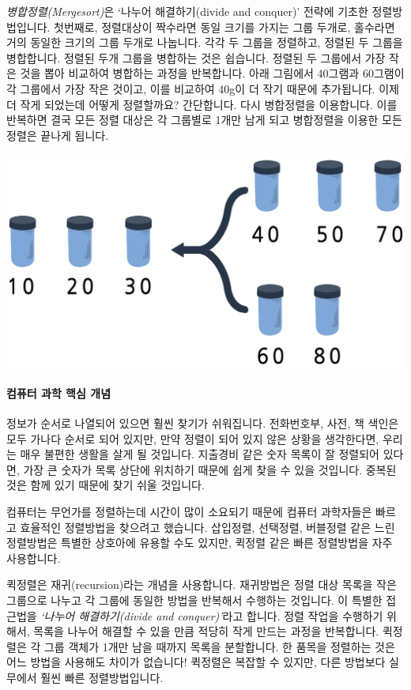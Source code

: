 \documentclass[]{article}
\begin{document}
\emph{병합정렬(Mergesort)}은 `나누어 해결하기(divide and conquer)'
전략에 기초한 정렬방법입니다. 첫번째로, 정렬대상이 짝수라면 동일 크기를
가지는 그룹 두개로, 홀수라면 거의 동일한 크기의 그룹 두개로 나눕니다.
각각 두 그룹을 정렬하고, 정렬된 두 그룹을 병합합니다. 정렬된 두개 그룹을
병합하는 것은 쉽습니다. 정렬된 두 그룹에서 가장 작은 것을 뽑아 비교하여
병합하는 과정을 반복합니다. 아래 그림에서 40그램과 60그램이 각 그룹에서
가장 작은 것이고, 이를 비교하여 40g이 더 작기 때문에 추가됩니다. 이제 더
작게 되었는데 어떻게 정렬할까요? 간단합니다. 다시 병합정렬을 이용합니다.
이를 반복하면 결국 모든 정렬 대상은 각 그룹별로 1개만 남게 되고
병합정렬을 이용한 모든 정렬은 끝나게 됩니다.

\includegraphics{csunplugged/02-part/img/ch07-sort/07-sort-05-merge.png}

\mbox{}\paragraph{컴퓨터 과학 핵심 개념}\label{section-110}

정보가 순서로 나열되어 있으면 훨씬 찾기가 쉬워집니다. 전화번호부, 사전,
책 색인은 모두 가나다 순서로 되어 있지만, 만약 정렬이 되어 있지 않은
상황을 생각한다면, 우리는 매우 불편한 생활을 살게 될 것입니다. 지출경비
같은 숫자 목록이 잘 정렬되어 있다면, 가장 큰 숫자가 목록 상단에 위치하기
때문에 쉽게 찾을 수 있을 것입니다. 중복된 것은 함께 있기 때문에 찾기
쉬울 것입니다.

컴퓨터는 무언가를 정렬하는데 시간이 많이 소요되기 때문에 컴퓨터
과학자들은 빠르고 효율적인 정렬방법을 찾으려고 했습니다. 삽입정렬,
선택정렬, 버블정렬 같은 느린 정렬방법은 특별한 상호아에 유용할 수도
있지만, 퀵정렬 같은 빠른 정렬방법을 자주 사용합니다.

퀵정렬은 재귀(recursion)라는 개념을 사용합니다. 재귀방법은 정렬 대상
목록을 작은 그룹으로 나누고 각 그룹에 동일한 방법을 반복해서 수행하는
것입니다. 이 특별한 접근법을 \emph{`나누어 해결하기(divide and
conquer)'}라고 합니다. 정렬 작업을 수행하기 위해서, 목록을 나누어 해결할
수 있을 만큼 적당히 작게 만드는 과정을 반복합니다. 퀵정렬은 각 그룹
객체가 1개만 남을 때까지 목록을 분할합니다. 한 품목을 정렬하는 것은 어느
방법을 사용해도 차이가 없습니다! 퀵정렬은 복잡할 수 있지만, 다른
방법보다 실무에서 훨씬 빠른 정렬방법입니다.
\end{document}
